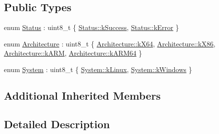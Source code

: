 \subsection*{Public Types}
\begin{DoxyCompactItemize}
\item 
enum \hyperlink{structresearch__interface_1_1robot_1_1LoadModelLibrary_ab76e415a2454c65950e686026c46bfa6}{Status} \+: uint8\+\_\+t \{ \hyperlink{structresearch__interface_1_1robot_1_1LoadModelLibrary_ab76e415a2454c65950e686026c46bfa6a8c632159fa131f09d04f94e3cbcd8782}{Status\+::k\+Success}, 
\hyperlink{structresearch__interface_1_1robot_1_1LoadModelLibrary_ab76e415a2454c65950e686026c46bfa6ae3587c730cc1aa530fa4ddc9c4204e97}{Status\+::k\+Error}
 \}
\item 
enum \hyperlink{structresearch__interface_1_1robot_1_1LoadModelLibrary_a89a2ad9a252c52861614214df33511f8}{Architecture} \+: uint8\+\_\+t \{ \hyperlink{structresearch__interface_1_1robot_1_1LoadModelLibrary_a89a2ad9a252c52861614214df33511f8a1b8e74371a25ec1290114a1b8d3cbfa9}{Architecture\+::k\+X64}, 
\hyperlink{structresearch__interface_1_1robot_1_1LoadModelLibrary_a89a2ad9a252c52861614214df33511f8a4656248fdd169cc08e6712274f32f579}{Architecture\+::k\+X86}, 
\hyperlink{structresearch__interface_1_1robot_1_1LoadModelLibrary_a89a2ad9a252c52861614214df33511f8ae9b98af778472ad261c01063525bb7b4}{Architecture\+::k\+A\+RM}, 
\hyperlink{structresearch__interface_1_1robot_1_1LoadModelLibrary_a89a2ad9a252c52861614214df33511f8a1026c5046ead18660a579d9faabc325f}{Architecture\+::k\+A\+R\+M64}
 \}
\item 
enum \hyperlink{structresearch__interface_1_1robot_1_1LoadModelLibrary_a64b0f0f01e8f2716ef4c2478037559eb}{System} \+: uint8\+\_\+t \{ \hyperlink{structresearch__interface_1_1robot_1_1LoadModelLibrary_a64b0f0f01e8f2716ef4c2478037559ebae3f917d82e495f1c002357925ca3047e}{System\+::k\+Linux}, 
\hyperlink{structresearch__interface_1_1robot_1_1LoadModelLibrary_a64b0f0f01e8f2716ef4c2478037559ebaad547616982f990862d4e1213452c089}{System\+::k\+Windows}
 \}
\end{DoxyCompactItemize}
\subsection*{Additional Inherited Members}


\subsection{Detailed Description}


